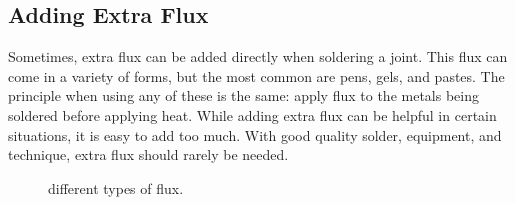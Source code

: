 \subsection{Adding Extra Flux}
Sometimes, extra flux can be added directly when soldering a joint. This flux can come in a variety of forms, but the most common are pens, gels, and pastes. The principle when using any of these is the same: apply flux to the metals being soldered before applying heat. While adding extra flux can be helpful in certain situations, it is easy to add too much. With good quality solder, equipment, and technique, extra flux should rarely be needed.
\begin{figure}[h]
    \centering
    \caption{different types of flux.}
    \begin{minipage}{0.33\textwidth}
        \centering
    \end{minipage}%
    \begin{minipage}{0.33\textwidth}
        \centering
    \end{minipage}%
    \begin{minipage}{0.33\textwidth}
        \centering
    \end{minipage}
\end{figure}

